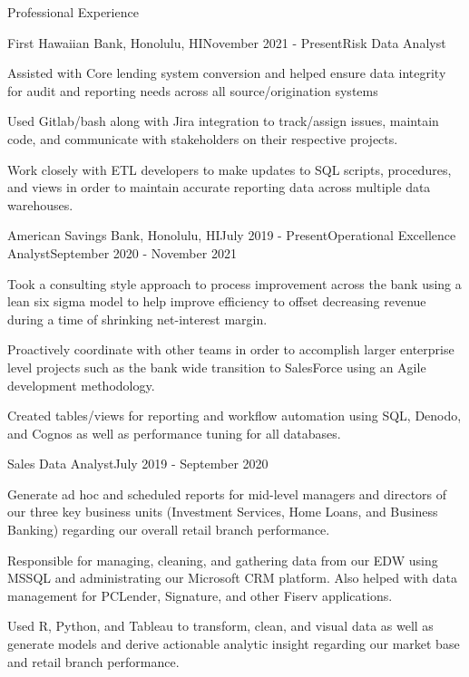 \documentclass{resume} %
\begin{document}
\begin{rSection}{Professional Experience}

\begin{rSubsection}{First Hawaiian Bank, Honolulu, HI}{November 2021 - Present}{Risk Data  Analyst}{}
\item Assisted with Core lending system conversion and helped ensure data integrity for audit and reporting needs across all source/origination systems
\item Used Gitlab/bash along with Jira integration to track/assign issues, maintain code, and communicate with stakeholders on their respective projects. 
\item Work closely with ETL developers to make updates to SQL scripts, procedures, and views in order to maintain accurate reporting data across multiple data warehouses.
\end{rSubsection}

\begin{rSubsection}{American Savings Bank, Honolulu, HI}{July 2019 - Present}{Operational Excellence Analyst}{September 2020 - November 2021}
\item Took a consulting style approach to process improvement across the bank using a lean six sigma model to help improve efficiency to offset decreasing revenue during a time of shrinking net-interest margin.
\item Proactively coordinate with other teams in order to accomplish larger enterprise level projects such as the bank wide transition to SalesForce using an Agile development methodology.
\item Created tables/views for reporting and workflow automation using SQL, Denodo, and Cognos as well as performance tuning for all databases.
\end{rSubsection}

\vspace{-1.3em}

\begin{rSubsection}{}{}{Sales Data Analyst}{July 2019 - September 2020}
\item Generate ad hoc and scheduled reports for mid-level managers and directors of our three key business units (Investment Services, Home Loans, and Business Banking) regarding our overall retail branch performance.
\item Responsible for managing, cleaning, and gathering data from our EDW using MSSQL and administrating our Microsoft CRM platform. Also helped with data management for PCLender, Signature, and other Fiserv applications.
\item Used R, Python, and Tableau to transform, clean, and visual data as well as generate models and derive actionable analytic insight regarding our market base and retail branch performance.
\end{rSubsection}

\end{rSection}
\end{document}
